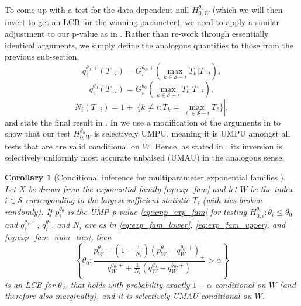 \documentclass{article}
\newtheorem{corollary}{Corollary}
\begin{document}
To come up with a test for the data dependent null $H_{0, W}^{\theta_0}$ (which we will then invert to get an LCB for the winning parameter), we need to apply a similar adjustment to our p-value as in . Rather than re-work through essentially identical arguments, we simply define the analogous quantities to those from the previous sub-section,
\begin{equation}
    \label{eq:exp_fam_lower}
    q^{\theta_0, +}_i(T_{-i}) = G^{\theta_0, +}_i(\max_{k \in \mathcal{S} - i } T_k | T_{-i}), 
\end{equation} 
\begin{equation}
    \label{eq:exp_fam_upper}
    q^{\theta_0}_i(T_{-i}) = G^{\theta_0}_i(\max_{k \in \mathcal{S} - i } T_k | T_{-i}),
\end{equation} 
\begin{equation}
    \label{eq:exp_fam_num_ties}
    N_i(T_{-i}) = 1 + | \{k \neq i: T_k = \max_{\ell \in \mathcal{S} - i} T_\ell \}|,
\end{equation}
and state the final result in . In  we use a modification of the arguments in \cite{Fithian} to show that our test $H^{\theta_0}_{0, W}$ is selectively UMPU, meaning it is UMPU amongst all tests that are are valid conditional on $W$. Hence, as stated in , its inversion is selectively uniformly most accurate unbaised (UMAU) in the analogous sense. 

\begin{corollary}[Conditional inference for multiparameter exponential families ]
    \label{cor:cond_exp_fam}
    Let $X$ be drawn from the exponential family \eqref{eq:exp_fam} and let $W$ be the index $i \in \mathcal{S}$ corresponding to the largest sufficient statistic $T_i$ (with ties broken randomly). If $p^{\theta_0}_i$ is the UMP p-value \eqref{eq:ump_exp_fam} for testing $H^{\theta_0}_{0, i} : \theta_i \leq \theta_0 $ and $q^{\theta_0, +}_i$, $q^{\theta_0}_i$, and $N_i$ are as in \eqref{eq:exp_fam_lower}, \eqref{eq:exp_fam_upper}, and \eqref{eq:exp_fam_num_ties}, then 
    \begin{equation}
    \label{eq:cond_lcb_exp_fam}
    \left\{\theta_0 :  \frac{p^{\theta_0}_W - \left(1 - \frac{1}{N_i} \right)(p^{\theta_0}_W - q^{\theta_0, +}_W)_+ }{q^{\theta_0, +}_W + \frac{1}{N_i}(q^{\theta_0}_W - q^{\theta_0, +}_W) } > \alpha \right\} 
    \end{equation}
    is an LCB for $\theta_W$ that holds with probability exactly $1-\alpha$ conditional on $W$ (and therefore also marginally), and it is selectively UMAU conditional on $W$.
\end{corollary}
\end{document}
